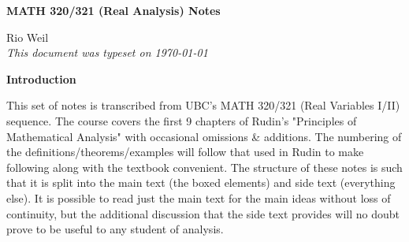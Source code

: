 \documentclass[10pt]{article}
\begin{document}
\begin{tcolorbox}
  \begin{center}
  \begin{Large}
    \textbf{MATH 320/321 (Real Analysis) Notes} \\
    \vspace{5pt}
  \end{Large}
  \begin{large}
        Rio Weil \\
\vspace{5pt}
    \emph{This document was typeset on \today}
  \end{large}
  \end{center}
\end{tcolorbox}

\begin{center}
  \textbf{Introduction}
  
  This set of notes is transcribed from UBC's MATH 320/321 (Real Variables I/II) sequence. The course covers the first 9 chapters of Rudin's "Principles of Mathematical Analysis" with occasional omissions \& additions. The numbering of the definitions/theorems/examples will follow that used in Rudin to make following along with the textbook convenient. The structure of these notes is such that it is split into the main text (the boxed elements) and side text (everything else). It is possible to read just the main text for the main ideas without loss of continuity, but the additional discussion that the side text provides will no doubt prove to be useful to any student of analysis.
\end{center}
\tableofcontents

\newpage










\end{document}
